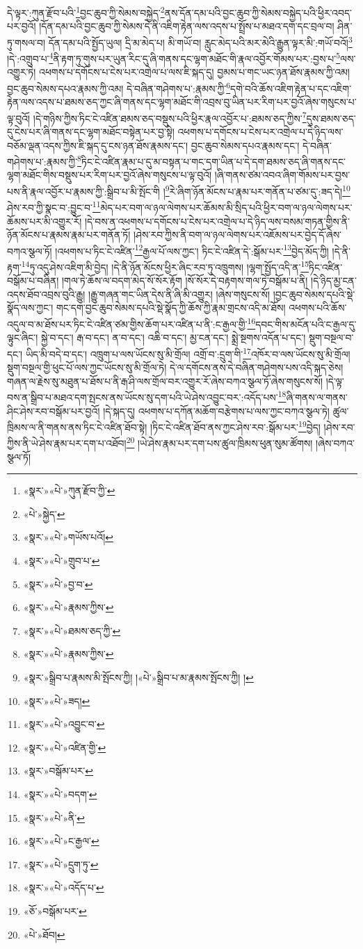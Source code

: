 དེ་ལྟར་:ཀུན་རྫོབ་པའི་\footnote{«སྣར་»«པེ་»ཀུན་རྫོབ་ཀྱི་}བྱང་ཆུབ་ཀྱི་སེམས་བསྐྱེད་\footnote{«པེ་»སྐྱེད་}ནས་དོན་དམ་པའི་བྱང་ཆུབ་ཀྱི་སེམས་བསྐྱེད་པའི་ཕྱིར་འབད་པར་བྱའོ། །དོན་དམ་པའི་བྱང་ཆུབ་ཀྱི་སེམས་དེ་ནི་འཇིག་རྟེན་ལས་འདས་པ་སྤྲོས་པ་མཐའ་དག་དང་བྲལ་བ། ཤིན་ཏུ་གསལ་བ། དོན་དམ་པའི་སྤྱོད་ཡུལ། དྲི་མ་མེད་པ། མི་གཡོ་བ། རླུང་མེད་པའི་མར་མེའི་རྒྱུན་ལྟར་མི་:གཡོ་བའོ།\footnote{«སྣར་»«པེ་»གཡོས་པའོ།} །དེ་:འགྲུབ་པ་\footnote{«སྣར་»«པེ་»གྲུབ་པ་}ནི་རྟག་ཏུ་གུས་པར་ཡུན་རིང་དུ་ཞི་གནས་དང་ལྷག་མཐོང་གི་རྣལ་འབྱོར་གོམས་པར་:བྱས་པ་\footnote{«སྣར་»«པེ་»བྱ་བ་}ལས་འགྱུར་ཏེ། འཕགས་པ་དགོངས་པ་ངེས་པར་འགྲེལ་པ་ལས་ཇི་སྐད་དུ། བྱམས་པ་གང་ཡང་ཉན་ཐོས་རྣམས་ཀྱི་འམ། བྱང་ཆུབ་སེམས་དཔའ་རྣམས་ཀྱི་འམ། དེ་བཞིན་གཤེགས་པ་:རྣམས་ཀྱི་\footnote{«སྣར་»«པེ་»རྣམས་ཀྱིས་}དགེ་བའི་ཆོས་འཇིག་རྟེན་པ་དང་འཇིག་རྟེན་ལས་འདས་པ་ཐམས་ཅད་ཀྱང་ཞི་གནས་དང་ལྷག་མཐོང་གི་འབྲས་བུ་ཡིན་པར་རིག་པར་བྱའོ་ཞེས་གསུངས་པ་ལྟ་བུའོ། །དེ་གཉིས་ཀྱིས་ཏིང་ངེ་འཛིན་ཐམས་ཅད་བསྡུས་པའི་ཕྱིར་རྣལ་འབྱོར་པ་:ཐམས་ཅད་ཀྱིས་\footnote{«སྣར་»«པེ་»ཐམས་ཅད་ཀྱི་}དུས་ཐམས་ཅད་དུ་ངེས་པར་ཞི་གནས་དང་ལྷག་མཐོང་བསྟེན་པར་བྱ་སྟེ། འཕགས་པ་དགོངས་པ་ངེས་པར་འགྲེལ་པ་དེ་ཉིད་ལས་བཅོམ་ལྡན་འདས་ཀྱིས་ཇི་སྐད་དུ་ངས་ཉན་ཐོས་རྣམས་དང་། བྱང་ཆུབ་སེམས་དཔའ་རྣམས་དང་། དེ་བཞིན་གཤེགས་པ་:རྣམས་ཀྱི་\footnote{«སྣར་»«པེ་»རྣམས་ཀྱིས་}ཏིང་ངེ་འཛིན་རྣམ་པ་དུ་མ་བསྟན་པ་གང་དག་ཡིན་པ་དེ་དག་ཐམས་ཅད་ཞི་གནས་དང་ལྷག་མཐོང་གིས་བསྡུས་པར་རིག་པར་བྱའོ་ཞེས་གསུངས་པ་ལྟ་བུའོ། །ཞི་གནས་ཙམ་འབའ་ཞིག་གོམས་པར་བྱས་པས་ནི་རྣལ་འབྱོར་པ་རྣམས་ཀྱི་:སྒྲིབ་པ་མི་སྤོང་གི །\footnote{«སྣར་»སྒྲིབ་པ་རྣམས་མི་སྤོངས་ཀྱི། །«པེ་»སྒྲིབ་པ་མ་རྣམས་སྤོངས་ཀྱི། །}རེ་ཞིག་ཉོན་མོངས་པ་རྣམ་པར་གནོན་པ་ཙམ་དུ་:ཟད་དེ།\footnote{«སྣར་»«པེ་»ཟད།} ཤེས་རབ་ཀྱི་སྣང་བ་:བྱུང་བ་\footnote{«སྣར་»«པེ་»འབྱུང་བ་}མེད་པར་བག་ལ་ཉལ་ལེགས་པར་ཆོམས་མི་སྲིད་པའི་ཕྱིར་བག་ལ་ཉལ་ལེགས་པར་ཆོམས་པར་མི་འགྱུར་རོ། །དེ་བས་ན་འཕགས་པ་དགོངས་པ་ངེས་པར་འགྲེལ་པ་དེ་ཉིད་ལས་བསམ་གཏན་གྱིས་ནི་ཉོན་མོངས་པ་རྣམས་རྣམ་པར་གནོན་ཏོ། །ཤེས་རབ་ཀྱིས་ནི་བག་ལ་ཉལ་ལེགས་པར་འཇོམས་པར་བྱེད་དོ་ཞེས་བཀའ་སྩལ་ཏོ། །འཕགས་པ་ཏིང་ངེ་འཛིན་\footnote{«སྣར་»«པེ་»འཛིན་གྱི་}རྒྱལ་པོ་ལས་ཀྱང་། ཏིང་ངེ་འཛིན་དེ་:སྒོམ་པར་\footnote{«སྣར་»བསྒོམ་པར་}བྱེད་མོད་ཀྱི། །དེ་ནི་རྟག་\footnote{«སྣར་»«པེ་»བདག་}ཏུ་འདུ་ཤེས་འཇིག་མི་བྱེད། །དེ་ནི་ཉོན་མོངས་ཕྱིར་ཞིང་རབ་ཏུ་འཁྲུགས། །ལྷག་སྤྱོད་འདི་ན་\footnote{«སྣར་»«པེ་»ནི་}ཏིང་འཛིན་བསྒོམ་པ་བཞིན། །གལ་ཏེ་ཆོས་ལ་བདག་མེད་སོ་སོར་རྟོག །སོ་སོར་དེ་བརྟགས་གལ་ཏེ་བསྒོམ་པ་ནི། །དེ་ཉིད་མྱ་ངན་འདས་ཐོབ་འབྲས་བུའི་རྒྱུ། །རྒྱུ་གཞན་གང་ཡིན་དེས་ནི་ཞི་མི་འགྱུར། །ཞེས་གསུངས་སོ། །བྱང་ཆུབ་སེམས་དཔའི་སྡེ་སྣོད་ལས་ཀྱང་། གང་དག་བྱང་ཆུབ་སེམས་དཔའི་སྡེ་སྣོད་ཀྱི་ཆོས་ཀྱི་རྣམ་གྲངས་འདི་མ་ཐོས། འཕགས་པའི་ཆོས་འདུལ་བ་མ་ཐོས་པར་ཏིང་ངེ་འཛིན་ཙམ་གྱིས་ཆོག་པར་འཛིན་པ་ནི་:ང་རྒྱལ་གྱི་\footnote{«སྣར་»«པེ་»ང་རྒྱལ་}དབང་གིས་མངོན་པའི་ང་རྒྱལ་དུ་ལྟུང་ཞིང་། སྐྱེ་བ་དང་། རྒ་བ་དང་། ན་བ་དང་། འཆི་བ་དང་། མྱ་ངན་དང་། སྨྲེ་སྔགས་འདོན་པ་དང་། སྡུག་བསྔལ་བ་དང་། ཡིད་མི་བདེ་བ་དང་། འཁྲུག་པ་ལས་ཡོངས་སུ་མི་གྲོལ། འགྲོ་བ་:དྲུག་གི་\footnote{«སྣར་»«པེ་»དྲུག་ཏུ་}འཁོར་བ་ལས་ཡོངས་སུ་མི་གྲོལ། སྡུག་བསྔལ་གྱི་ཕུང་པོ་ལས་ཀྱང་ཡོངས་སུ་མི་གྲོལ་ཏེ། དེ་ལ་དགོངས་ནས་དེ་བཞིན་གཤེགས་པས་འདི་སྐད་ཅེས། གཞན་ལ་རྗེས་སུ་མཐུན་པ་ཐོས་པ་ནི་རྒ་ཤི་ལས་གྲོལ་བར་འགྱུར་རོ་ཞེས་བཀའ་སྩལ་ཏོ་ཞེས་གསུངས་སོ། །དེ་ལྟ་བས་ན་སྒྲིབ་པ་མཐའ་དག་སྤངས་ནས་ཡོངས་སུ་དག་པའི་ཡེ་ཤེས་འབྱུང་བར་:འདོད་པས་\footnote{«སྣར་»«པེ་»འདོད་པ་}ཞི་གནས་ལ་གནས་ཤིང་ཤེས་རབ་བསྒོམ་པར་བྱའོ། །དེ་སྐད་དུ། འཕགས་པ་དཀོན་མཆོག་བརྩེགས་པ་ལས་ཀྱང་བཀའ་སྩལ་ཏེ། ཚུལ་ཁྲིམས་ལ་ནི་གནས་ནས་ཏིང་ངེ་འཛིན་ཐོབ་སྟེ། །ཏིང་ངེ་འཛིན་ཐོབ་ནས་ཀྱང་ཤེས་རབ་:སྒོམ་པར་\footnote{«ཅོ་»བསྒོམ་པར་}བྱེད། །ཤེས་རབ་ཀྱིས་ནི་ཡེ་ཤེས་རྣམ་པར་དག་པ་འཐོབ།\footnote{«པེ་»ཐོབ།} །ཡེ་ཤེས་རྣམ་པར་དག་པས་ཚུལ་ཁྲིམས་ཕུན་སུམ་ཚོགས། །ཞེས་བཀའ་སྩལ་ཏོ། 